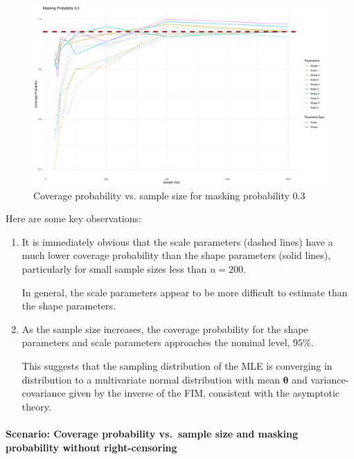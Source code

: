 \documentclass[
]{article}
\begin{document}
\begin{figure}

{\centering \includegraphics{image/plot-coverage-p_0.3-vs-sample-size} 

}

\caption{Coverage probability vs. sample size for masking probability $0.3$}\label{fig:plot-coverage-p-three-vs-sample-size}
\end{figure}

Here are some key observations:

\begin{enumerate}
\def\labelenumi{\arabic{enumi}.}
\item
  It is immediately obvious that the scale parameters (dashed lines)
  have a much lower coverage probability than the shape parameters
  (solid lines), particularly for small sample sizes less than
  \(n = 200\).

  In general, the scale parameters appear to be more difficult to
  estimate than the shape parameters.
\item
  As the sample size increases, the coverage probability for the shape
  parameters and scale parameters approaches the nominal level,
  \(95\%\).

  This suggests that the sampling distribution of the MLE is converging
  in distribution to a multivariate normal distribution with mean
  \(\boldsymbol{\theta}\) and variance-covariance given by the inverse
  of the FIM, consistent with the asymptotic theory.
\end{enumerate}

\hypertarget{scenario-coverage-probability-vs.-sample-size-and-masking-probability-without-right-censoring}{%
\paragraph*{Scenario: Coverage probability vs.~sample size and masking
probability without
right-censoring}\label{scenario-coverage-probability-vs.-sample-size-and-masking-probability-without-right-censoring}}
\end{document}
